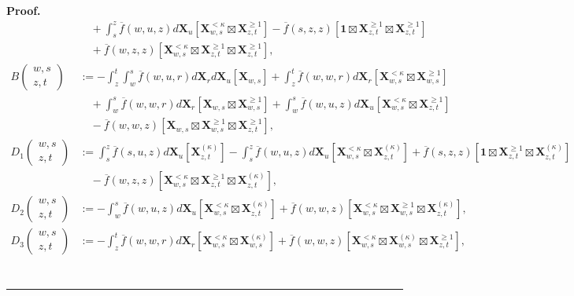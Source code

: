 \documentclass{article}%
\newenvironment{proof}[1][Proof]{\noindent\textbf{#1.} }{\ \rule{0.5em}{0.5em}}
\begin{document}
\begin{proof}
\begin{align*}
&\quad+ \int_s^z  \overline f(w,u,z)  d\mathbf{X}_u \left[ \mathbf{X}^{< \kappa}_{w,s}\boxtimes \mathbf{X}^{\ge 1}_{z,t}  \right] - \overline f(s,z,z) \left[\mathbf{1} \boxtimes \mathbf{X}^{\geq 1}_{z,t} \boxtimes \mathbf{X}^{\geq 1}_{z,t}\right] \\
& \quad + \overline f(w,z,z) \left[\mathbf{X}^{< \kappa}_{w,s} \boxtimes \mathbf{X}^{\geq 1}_{z,t} \boxtimes \mathbf{X}^{\geq 1}_{z,t}\right],\\
B\begin{pmatrix} w,s \\ z,t \end{pmatrix}&:= - \int_z^t \int_w^s \overline f(w,u,r) d\mathbf{X}_r d\mathbf{X}_u \left[\mathbf{X}_{w,s}\right]  + \int_z^t  \overline f(w,w,r) d\mathbf{X}_r  \left[\mathbf{X}^{< \kappa}_{w,s} \boxtimes \mathbf{X}^{\geq 1}_{w,s}\right] 
\\
&\quad+ \int_w^s  \overline f(w,w,r) d\mathbf{X}_r  \left[\mathbf{X}_{w,s} \boxtimes \mathbf{X}^{\geq 1}_{w,s}\right] + \int_w^s \overline f(w,u,z) d\mathbf{X}_u [ \mathbf{X}^{< \kappa}_{w,s} \boxtimes \mathbf{X}^{\ge 1}_{z,t}] \\
&\quad - \overline{f}(w,w,z)\left[ \mathbf{X}_{w,s} \boxtimes \mathbf{X}^{\ge 1}_{w,s} \boxtimes \mathbf{X}^{\ge 1}_{z,t}\right],\\
D_1\begin{pmatrix} w,s \\ z,t \end{pmatrix} &:= \int_s^z \overline f(s,u,z) d\mathbf{X}_u \left[\mathbf{X}^{(\kappa)}_{z,t}\right] - \int_s^z \overline f(w,u,z) d\mathbf{X}_u \left[\mathbf{X}^{< \kappa}_{w,s} \boxtimes \mathbf{X}^{(\kappa)}_{z,t}\right] + \overline f(s,z,z) \left[\mathbf{1} \boxtimes \mathbf{X}^{\geq 1}_{z,t} \boxtimes \mathbf{X}^{(\kappa)}_{z,t}\right]\\
&\quad -\overline f(w,z,z) \left[\mathbf{X}^{< \kappa}_{w,s} \boxtimes \mathbf{X}^{\geq 1}_{z,t} \boxtimes \mathbf{X}^{(\kappa)}_{z,t}\right],\\
D_2\begin{pmatrix} w,s \\ z,t \end{pmatrix} &:= - \int_w^s \overline f(w,u,z) d\mathbf{X}_u \left[\mathbf{X}^{< \kappa}_{w,s} \boxtimes \mathbf{X}^{(\kappa)}_{z,t}\right] + \overline{f}(w,w,z)\left[ \mathbf{X}^{< \kappa}_{w,s} \boxtimes \mathbf{X}^{\ge 1}_{w,s} \boxtimes \mathbf{X}^{(\kappa)}_{z,t}\right],\\
D_3\begin{pmatrix} w,s \\ z,t \end{pmatrix} &:= -\int_z^t  \overline f(w,w,r) d\mathbf{X}_r  \left[\mathbf{X}^{< \kappa}_{w,s} \boxtimes \mathbf{X}^{(\kappa)}_{w,s}\right] +  \overline{f}(w,w,z)\left[ \mathbf{X}^{< \kappa}_{w,s} \boxtimes \mathbf{X}^{(\kappa)}_{w,s} \boxtimes \mathbf{X}^{\ge 1}_{z,t}\right],\\

\end{align*}
\end{proof}
\end{document}
